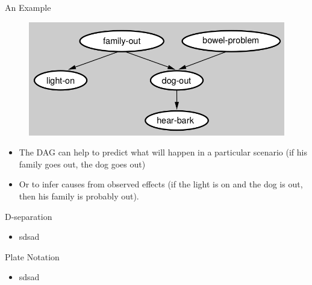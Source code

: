 \documentclass[handout]{beamer}
\begin{document}
\begin{frame}{An Example}
\scriptsize{

\begin{figure}[h!]
	\centering
	\includegraphics[scale=0.4]{pics/fodag.png}
	\end{figure} 

\begin{itemize}

\item The DAG can help to predict what will happen in a particular scenario (if his family goes out, the dog goes out) 
\item Or to infer causes from observed effects (if the light is on and the dog is out, then his family is probably out).



 
\end{itemize}



} 

\end{frame}


\begin{frame}{D-separation}
\scriptsize{
\begin{itemize}
\item sdsad

 
\end{itemize}



} 

\end{frame}


\begin{frame}{Plate Notation}
\scriptsize{
\begin{itemize}
\item sdsad

 
\end{itemize}



} 

\end{frame}
\end{document}
